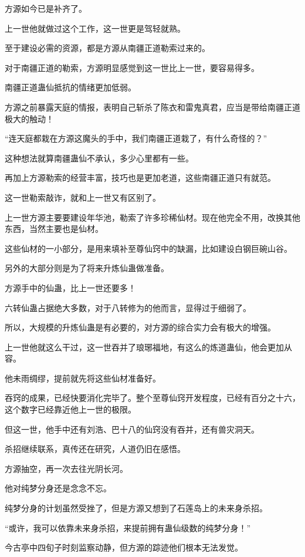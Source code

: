 \begin{this_body}
方源如今已是补齐了。

上一世他就做过这个工作，这一世更是驾轻就熟。

至于建设必需的资源，都是方源从南疆正道勒索过来的。

对于南疆正道的勒索，方源明显感觉到这一世比上一世，要容易得多。

南疆正道蛊仙抵抗的情绪更加低弱。

方源之前暴露天庭的情报，表明自己斩杀了陈衣和雷鬼真君，应当是带给南疆正道极大的触动！

“连天庭都栽在方源这魔头的手中，我们南疆正道栽了，有什么奇怪的？”

这种想法就算南疆蛊仙不承认，多少心里都有一些。

再加上方源勒索的经营丰富，技巧也是更加老道，这些南疆正道只有就范。

这一世勒索敲诈，就和上一世又有区别了。

上一世方源主要要建设年华池，勒索了许多珍稀仙材。现在他完全不用，改换其他东西，当然主要也是仙材。

这些仙材的一小部分，是用来填补至尊仙窍中的缺漏，比如建设白钢巨碗山谷。

另外的大部分则是为了将来升炼仙蛊做准备。

方源手中的仙蛊，比上一世还要多！

六转仙蛊占据绝大多数，对于八转修为的他而言，显得过于细弱了。

所以，大规模的升炼仙蛊是有必要的，对方源的综合实力会有极大的增强。

上一世他就这么干过，这一世吞并了琅琊福地，有这么的炼道蛊仙，他会更加从容。

他未雨绸缪，提前就先将这些仙材准备好。

吞窍的成果，已经快要消化完毕了。整个至尊仙窍开发程度，已经有百分之十六，这个数字已经靠近他上一世的极限。

但这一世，他手中还有刘浩、巴十八的仙窍没有吞并，还有兽灾洞天。

杀招继续联系，真传还在研究，人道仍旧在感悟。

方源抽空，再一次去往光阴长河。

他对纯梦分身还是念念不忘。

纯梦分身的计划虽然受挫了，但是方源又想到了石莲岛上的未来身杀招。

“或许，我可以依靠未来身杀招，来提前拥有蛊仙级数的纯梦分身！”

今古亭中四旬子时刻监察动静，但方源的踪迹他们根本无法发觉。


\end{this_body}
